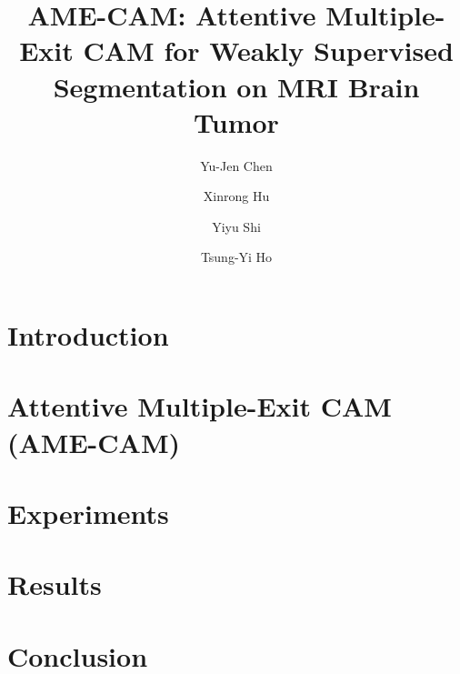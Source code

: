 \documentclass[runningheads]{llncs}
\begin{document}
%
\title{AME-CAM: Attentive Multiple-Exit CAM for Weakly Supervised Segmentation on MRI Brain Tumor}

\author{Yu-Jen Chen %
\and Xinrong Hu %
\and Yiyu Shi %
\and Tsung-Yi Ho %
}



%
\maketitle              %
%
\begin{abstract}

\end{abstract}

\section{Introduction}
\label{sec:intro}


% 

\section{Attentive Multiple-Exit CAM (AME-CAM)}
\label{sec:methodology}


\section{Experiments}
\label{sec:experiments}


\section{Results}
\label{sec:results}




\section{Conclusion}
\label{sec:conclusion}


{\small


}
\end{document}
